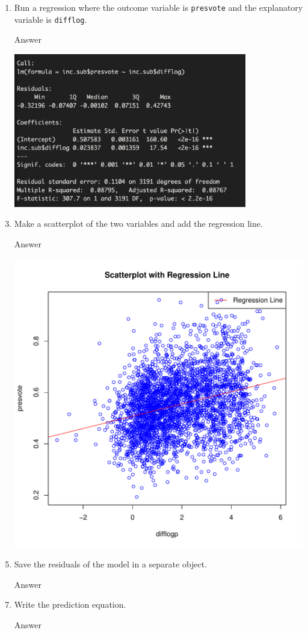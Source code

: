 \documentclass[12pt,letterpaper]{article}
\begin{document}
	\begin{enumerate}
		\item Run a regression where the outcome variable is \texttt{presvote} and the explanatory variable is \texttt{difflog}.
		\item [Answer]
		 
		\includegraphics[width=0.8\textwidth]{q2.png}
		\vspace{5cm}
		\item Make a scatterplot of the two variables and add the regression line. 	
		\item [Answer]
		 
		\includegraphics[width=.85\textwidth]{lm_pres_diff.pdf}
		\vspace{5cm}
		\item Save the residuals of the model in a separate object.	
		\item [Answer]
		 
		\vspace{5cm}
		\item Write the prediction equation.
		\item [Answer]
		 
	\end{enumerate}
	
\end{document}

